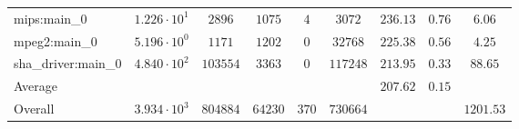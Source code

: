 \begin{tabular}{|l|c|c|c|c|c|c|c|c|}
mips:main\_0            & $ 1.226 \cdot 10^{1}  $ & $ 2896   $ & $ 1075  $ & $ 4   $ & $ 3072   $ & $ 236.13      $ & $ 0.76    $ & $ 6.06    $ \\
mpeg2:main\_0           & $ 5.196 \cdot 10^{0}  $ & $ 1171   $ & $ 1202  $ & $ 0   $ & $ 32768  $ & $ 225.38      $ & $ 0.56    $ & $ 4.25    $ \\
sha\_driver:main\_0     & $ 4.840 \cdot 10^{2}  $ & $ 103554 $ & $ 3363  $ & $ 0   $ & $ 117248 $ & $ 213.95      $ & $ 0.33    $ & $ 88.65   $ \\
\hline
Average                 & $                     $ & $        $ & $       $ & $     $ & $        $ & $ 207.62      $ & $ 0.15    $ & $         $ \\
\hline
Overall                 & $ 3.934 \cdot 10^{3}  $ & $ 804884 $ & $ 64230 $ & $ 370 $ & $ 730664 $ & $             $ & $         $ & $ 1201.53 $ \\
\hline
\end{tabular}
